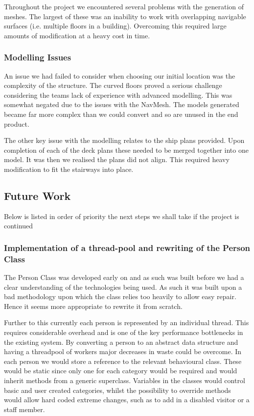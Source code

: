 Throughout the project we encountered several problems with the generation
of meshes. The largest of these was an inability to work with overlapping
navigable surfaces (i.e. multiple floors in a building). Overcoming
this required large amounts of modification at a heavy cost in time.


\subsubsection*{Modelling Issues}

An issue we had failed to consider when choosing our initial location
was the complexity of the structure. The curved floors proved a serious
challenge considering the teams lack of experience with advanced modelling.
This was somewhat negated due to the issues with the NavMesh. The
models generated became far more complex than we could convert and
so are unused in the end product.

The other key issue with the modelling relates to the ship plans provided.
Upon completion of each of the deck plans these needed to be merged
together into one model. It was then we realised the plans did not
align. This required heavy modification to fit the stairways into
place.


\subsection{Future Work}

Below is listed in order of priority the next steps we shall take
if the project is continued


\subsubsection*{Implementation of a thread-pool and rewriting of the Person Class}

The Person Class was developed early on and as such was built before
we had a clear understanding of the technologies being used. As such
it was built upon a bad methodology upon which the class relies too
heavily to allow easy repair. Hence it seems more appropriate to rewrite
it from scratch.

Further to this currently each person is represented by an individual
thread. This requires considerable overhead and is one of the key
performance bottlenecks in the existing system. By converting a person
to an abstract data structure and having a threadpool of workers major
decreases in waste could be overcome. In each person we would store
a reference to the relevant behavioural class. These would be static
since only one for each category would be required and would inherit
methods from a generic superclass. Variables in the classes would
control basic and user created categories, whilst the possibility
to override methods would allow hard coded extreme changes, such as
to add in a disabled visitor or a staff member.

